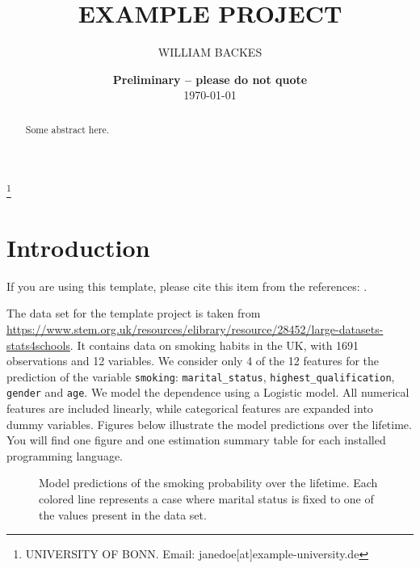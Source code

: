\documentclass[11pt, a4paper, leqno]{article}
\begin{document}
\title{EXAMPLE PROJECT}
\thanks{UNIVERSITY OF BONN. Email: janedoe[at]example-university.de}

\author{WILLIAM BACKES}

\date{
    {\bf Preliminary -- please do not quote}
    \\[1ex]
    \today
}

\maketitle


\begin{abstract}
    Some abstract here.
\end{abstract}

\clearpage


\section{Introduction} %
\label{sec:introduction}

If you are using this template, please cite this item from the references:
\citet{GaudeckerEconProjectTemplates}.

The data set for the template project is taken from
\url{https://www.stem.org.uk/resources/elibrary/resource/28452/large-datasets-stats4schools}.
It contains data on smoking habits in the UK, with 1691 observations and 12 variables.
We consider only 4 of the 12 features for the prediction of the variable
\texttt{smoking}: \texttt{marital\_status}, \texttt{highest\_qualification},
\texttt{gender} and \texttt{age}. We model the dependence using a Logistic model. All
numerical features are included linearly, while categorical features are expanded into
dummy variables. Figures below illustrate the model predictions over the lifetime. You
will find one figure and one estimation summary table for each installed programming
language.


\begin{figure}[H]

    \centering

    \caption{Model predictions of the smoking probability over the lifetime. Each
        colored line represents a case where marital status is fixed to one of the
        values present in the data set.}
    \label{fig:predictions}

\end{figure}


\begin{table}[!h]
%    
    \label{tab:summary}
    \caption{Estimation results of the linear Logistic regression.}
\end{table}



\printbibliography
{}



\end{document}
